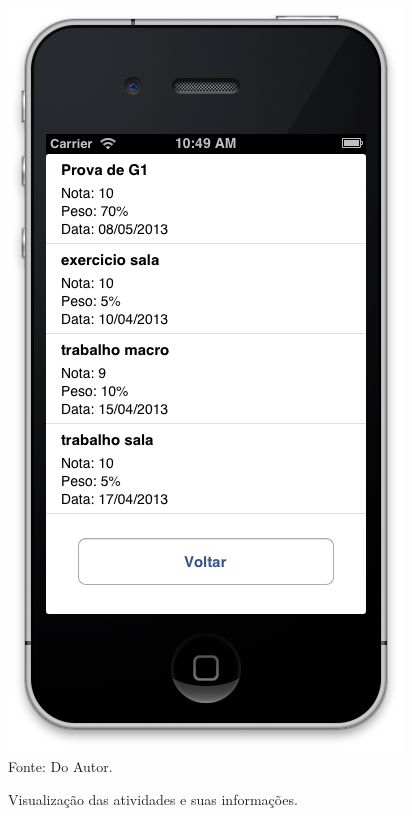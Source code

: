 \begin{figure}[!htb]
     \centering
     \caption[Formulário Notas da Graduação - Visualização de Atividades]{Visualização das atividades e suas informações.}
     \includegraphics[scale=0.5]{imagens/formatividades.png}
     \\  Fonte: Do Autor.
\end{figure}
